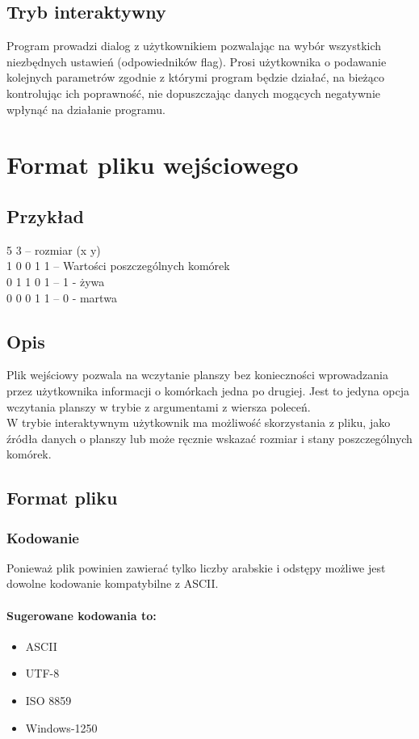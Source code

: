 \documentclass{report}
\begin{document}
\subsection{Tryb interaktywny} \label{interaktywny}
Program prowadzi dialog z użytkownikiem pozwalając na wybór wszystkich niezbędnych ustawień (odpowiedników flag). Prosi użytkownika o podawanie kolejnych parametrów zgodnie z którymi program będzie działać, na bieżąco kontrolując ich poprawność, nie dopuszczając danych mogących negatywnie wpłynąć na działanie programu.

\section{Format pliku wejściowego}  \label{format}
\subsection*{Przykład}
5 3 \tab -- rozmiar (x y) \\
1 0 0 1 1 \tab -- Wartości poszczególnych komórek \\
0 1 1 0 1 \tab -- 1 - żywa \\
0 0 0 1 1 \tab -- 0 - martwa \\

\subsection*{Opis} 
Plik wejściowy pozwala na wczytanie planszy bez konieczności wprowadzania przez użytkownika informacji o komórkach jedna po drugiej.
Jest to jedyna opcja wczytania planszy w trybie z argumentami z wiersza poleceń. \\
W trybie interaktywnym użytkownik ma możliwość skorzystania z pliku, jako źródła danych o planszy lub może ręcznie wskazać rozmiar i stany poszczególnych komórek.

\subsection*{Format pliku}
\subsubsection*{Kodowanie}
Ponieważ plik powinien zawierać tylko liczby arabskie i odstępy możliwe jest dowolne kodowanie kompatybilne z ASCII. \\
\paragraph{Sugerowane kodowania to:}
\begin{itemize}
\item ASCII
\item UTF-8
\item ISO 8859
\item Windows-1250
\end{itemize}
\end{document}
